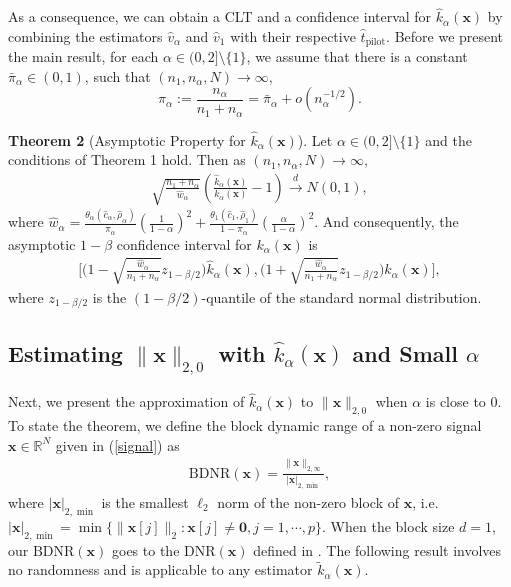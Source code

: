 \documentclass[journal,onecolumn]{IEEEtran}
\begin{document}
As a consequence, we can obtain a CLT and a confidence interval for $\hat{k}_\alpha(\mathbf{x})$ by combining the estimators $\hat{v}_{\alpha}$ and $\hat{v}_1$ with their respective $\hat{t}_{\mathrm{pilot}}$. Before we present the main result, for each $\alpha\in(0,2]\setminus\{1\}$, we assume that there is a constant $\bar{\pi}_\alpha\in (0,1)$, such that $(n_1,n_\alpha,N)\rightarrow\infty$, $$
\pi_\alpha:=\frac{n_\alpha}{n_1+n_\alpha}=\bar{\pi}_\alpha+o(n_\alpha^{-1/2}).
$$

\noindent
{\bf Theorem 2} (Asymptotic Property for $\hat{k}_{\alpha}(\mathbf{x})$). Let $\alpha\in(0,2]\setminus\{1\}$ and the conditions of Theorem 1 hold. Then as $(n_1,n_\alpha,N)\rightarrow\infty$, \begin{align}
\sqrt{\frac{n_1+n_\alpha}{\hat{w}_\alpha}}\left(\frac{\hat{k}_\alpha(\mathbf{x})}{k_{\alpha}(\mathbf{x})}-1\right)\overset{d}\longrightarrow N(0,1),
\end{align}
where $\hat{w}_\alpha=\frac{\theta_\alpha(\hat{c}_\alpha,\hat{\rho}_{\alpha})}{\pi_\alpha}(\frac{1}{1-\alpha})^2+\frac{\theta_1(\hat{c}_1,\hat{\rho}_1)}{1-\pi_\alpha}(\frac{\alpha}{1-\alpha})^2$. And consequently, the asymptotic $1-\beta$ confidence interval for $k_{\alpha}(\mathbf{x})$ is \begin{align}
\bigg[\Big(1-\sqrt{\frac{\hat{w}_\alpha}{n_1+n_\alpha}}z_{1-\beta/2}\Big)\hat{k}_\alpha(\mathbf{x}),\Big(1+\sqrt{\frac{\hat{w}_\alpha}{n_1+n_\alpha}}z_{1-\beta/2}\Big)\hat{k}_\alpha(\mathbf{x})\bigg],
\end{align}
where $z_{1-\beta/2}$ is the $(1-\beta/2)$-quantile of the standard normal distribution.\\

\subsection{Estimating $\lVert\mathbf{x}\rVert_{2,0}$ with $\hat{k}_{\alpha}(\mathbf{x})$ and Small $\alpha$}

Next, we present the approximation of $\hat{k}_\alpha(\mathbf{x})$ to $\lVert\mathbf{x}\rVert_{2,0}$ when $\alpha$ is close to $0$. To state the theorem, we define the block dynamic range of a non-zero signal $\mathbf{x}\in\mathbb{R}^N$ given in (\ref{signal}) as \begin{align}
\mathrm{BDNR}(\mathbf{x})=\frac{\lVert\mathbf{x}\rVert_{2,\infty}}{|\mathbf{x}|_{2,\min}},
\end{align}
where $|\mathbf{x}|_{2,\min}$ is the smallest $\ell_2$ norm of the non-zero block of $\mathbf{x}$, i.e. $|\mathbf{x}|_{2,\min}=\min\{\lVert\mathbf{x}[j]\rVert_2:\mathbf{x}[j]\neq \mathbf{0}, j=1,\cdots,p\}$. When the block size $d=1$, our $\mathrm{BDNR}(\mathbf{x})$ goes to the $\mathrm{DNR}(\mathbf{x})$ defined in \cite{l2}. The following result involves no randomness and is applicable to any estimator $\tilde{k}_{\alpha}(\mathbf{x})$. \\
\end{document}
